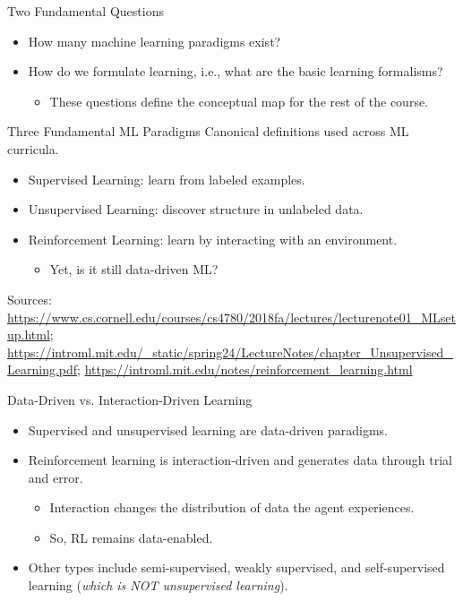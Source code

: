 \documentclass[10pt]{beamer}
\begin{document}
\begin{frame}{Two Fundamental Questions}
    \justifying
    \begin{itemize}
        \item How many machine learning paradigms exist?
        \item How do we formulate learning, i.e., what are the basic learning formalisms?
        \begin{itemize}
            \item These questions define the conceptual map for the rest of the course.
        \end{itemize}
    \end{itemize}
\end{frame}

\begin{frame}{Three Fundamental ML Paradigms}
    \justifying
    Canonical definitions used across ML curricula.
    \begin{itemize}
        \item Supervised Learning: learn from labeled examples.
        \item Unsupervised Learning: discover structure in unlabeled data.
        \item Reinforcement Learning: learn by interacting with an environment.
        \begin{itemize}
            \item Yet, is it still data-driven ML?
        \end{itemize}
\end{itemize}
    \vspace{0.5em}
    {\footnotesize Sources: \url{https://www.cs.cornell.edu/courses/cs4780/2018fa/lectures/lecturenote01_MLsetup.html};
    \url{https://introml.mit.edu/_static/spring24/LectureNotes/chapter_Unsupervised_Learning.pdf};
    \url{https://introml.mit.edu/notes/reinforcement_learning.html}}
\end{frame}

\begin{frame}{Data-Driven vs. Interaction-Driven Learning}
    \justifying
    \begin{itemize}
        \item Supervised and unsupervised learning are data-driven paradigms.
        \item Reinforcement learning is interaction-driven and generates data through trial and error.
        \begin{itemize}
            \item Interaction changes the distribution of data the agent experiences.
            \item So, RL remains data-enabled. 
        \end{itemize}
        \item Other types include semi-supervised, weakly supervised, and self-supervised learning (\textit{which is NOT unsupervised learning}).
    \end{itemize}
\end{frame}
\end{document}
